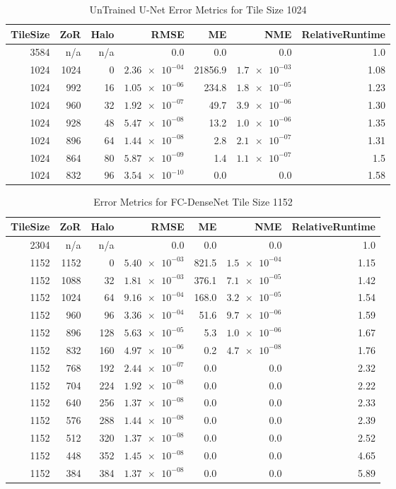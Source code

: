 \documentclass[twoside,11pt]{article}
\begin{document}
\begin{table}[h!]
	\centering
	\caption{UnTrained U-Net Error Metrics for Tile Size 1024}
	\label{tab:tile_size_1024}
	\begin{tabular}{r|r|r|r|r|r|r}
		TileSize & ZoR & Halo & RMSE    & ME & NME & RelativeRuntime \\ 
		\hline
		3584 & n/a & n/a & 0.0 & 0.0 & 0.0 & 1.0 \\
		1024 & 1024 & 0 & $\num{2.36e-04}$ & 21856.9 & $\num{1.7e-03}$ & 1.08 \\
		1024 & 992 & 16 & $\num{1.05e-06}$ & 234.8 & $\num{1.8e-05}$ & 1.23 \\
		1024 & 960 & 32 & $\num{1.92e-07}$ & 49.7 & $\num{3.9e-06}$ & 1.30 \\
		1024 & 928 & 48 & $\num{5.47e-08}$ & 13.2 & $\num{1.0e-06}$ & 1.35 \\
		1024 & 896 & 64 & $\num{1.44e-08}$ & 2.8 & $\num{2.1e-07}$ & 1.31 \\
		1024 & 864 & 80 & $\num{5.87e-09}$ & 1.4 & $\num{1.1e-07}$ & 1.5 \\
		1024 & 832 & 96 & $\num{3.54e-10}$ & 0.0 & 0.0 & 1.58 \\
	\end{tabular}
\end{table}


\begin{table}[h!]
	\centering
	\caption{Error Metrics for FC-DenseNet Tile Size 1152}
	\label{tab:tile_size_1152}
	\begin{tabular}{r|r|r|r|r|r|r}
		TileSize & ZoR & Halo & RMSE    & ME & NME & RelativeRuntime \\ 
		\hline
		2304 & n/a & n/a & 0.0 & 0.0 & 0.0 & 1.0 \\
		1152 & 1152 & 0 & $\num{5.40e-03}$ & 821.5 & $\num{1.5e-04}$ & 1.15 \\
		1152 & 1088 & 32 & $\num{1.81e-03}$ & 376.1 & $\num{7.1e-05}$ & 1.42 \\
		1152 & 1024 & 64 & $\num{9.16e-04}$ & 168.0 & $\num{3.2e-05}$ & 1.54 \\
		1152 & 960 & 96 & $\num{3.36e-04}$ & 51.6 & $\num{9.7e-06}$ & 1.59 \\
		1152 & 896 & 128 & $\num{5.63e-05}$ & 5.3 & $\num{1.0e-06}$ & 1.67 \\
		1152 & 832 & 160 & $\num{4.97e-06}$ & 0.2 & $\num{4.7e-08}$ & 1.76 \\
		1152 & 768 & 192 & $\num{2.44e-07}$ & 0.0 & 0.0 & 2.32 \\
		1152 & 704 & 224 & $\num{1.92e-08}$ & 0.0 & 0.0 & 2.22 \\
		1152 & 640 & 256 & $\num{1.37e-08}$ & 0.0 & 0.0 & 2.33 \\
		1152 & 576 & 288 & $\num{1.44e-08}$ & 0.0 & 0.0 & 2.39 \\
		1152 & 512 & 320 & $\num{1.37e-08}$ & 0.0 & 0.0 & 2.52 \\
		1152 & 448 & 352 & $\num{1.45e-08}$ & 0.0 & 0.0 & 4.65 \\
		1152 & 384 & 384 & $\num{1.37e-08}$ & 0.0 & 0.0 & 5.89 \\
	\end{tabular}
\end{table}
\end{document}
